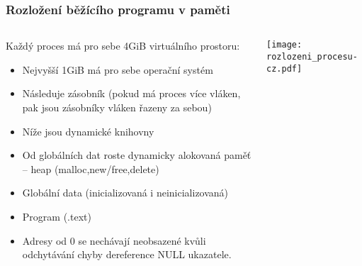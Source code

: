 \documentclass{beamer}
\begin{document}
\begin{frame}
\frametitle{Rozložení běžícího programu v paměti}

\begin{columns}
\begin{column}{0.75\textwidth}
Každý proces má pro sebe 4GiB virtuálního prostoru:
\small
\begin{itemize}
\item Nejvyšší 1GiB má pro sebe operační systém
\item Následuje zásobník (pokud má proces více vláken, pak jsou zásobníky vláken řazeny za sebou)
\item Níže jsou dynamické knihovny
\item Od globálních dat roste dynamicky alokovaná paměť -- heap (malloc,new/free,delete)
\item Globální data (inicializovaná i neinicializovaná)
\item Program (.text)
\item Adresy od 0 se nechávají neobsazené kvůli odchytávání chyby dereference NULL ukazatele.
\end{itemize}
\end{column}   
\begin{column}{0.25\textwidth}  
\texttt{[image: rozlozeni\_procesu-cz.pdf]}
\end{column}
\end{columns}
\end{frame}
\end{document}
